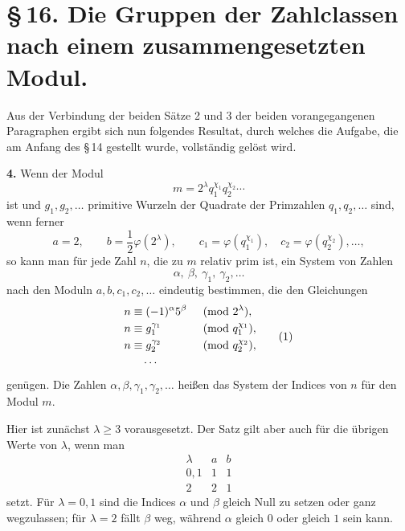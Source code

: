 \documentclass[11pt]{article}
\begin{document}

\section*{\S\,16. Die Gruppen der Zahlclassen nach einem zusammengesetzten Modul.}

Aus der Verbindung der beiden Sätze 2 und 3 der beiden vorangegangenen Paragraphen ergibt sich nun folgendes Resultat, durch welches die Aufgabe, die am Anfang des \S\,14 gestellt wurde, vollständig gelöst wird.

\medskip
\noindent\textbf{4.} Wenn der Modul
\begin{equation}
 m=2^\lambda q_1^{\chi_1}q_2^{\chi_2}\cdots
\end{equation}
ist und $g_1,g_2,\ldots$ primitive Wurzeln der Quadrate der Primzahlen $q_1,q_2,\ldots$ sind, wenn ferner
\[
 a=2,
 \qquad b=\frac12\varphi(2^\lambda),
 \qquad c_1=\varphi(q_1^{\chi_1}),\quad c_2=\varphi(q_2^{\chi_2}),\ldots,
\]
so kann man für jede Zahl $n$, die zu $m$ relativ prim ist, ein System von Zahlen
\[
 \alpha,\ \beta,\ \gamma_1,\ \gamma_2,\ldots
\]
nach den Moduln $a,b,c_1,c_2,\ldots$ eindeutig bestimmen, die den Gleichungen
\begin{equation}
\begin{aligned}
 n&\equiv (-1)^\alpha 5^\beta &&\pmod {2^\lambda},\\
 n&\equiv g_1^{\gamma_1} &&\pmod {q_1^{\chi_1}},\\
 n&\equiv g_2^{\gamma_2} &&\pmod {q_2^{\chi_2}},\\
 &\hspace{1.0em}\cdots
\end{aligned}
\tag{1}
\end{equation}
genügen. Die Zahlen $\alpha,\beta,\gamma_1,\gamma_2,\ldots$ heißen das System der Indices von $n$ für den Modul $m$.

Hier ist zunächst $\lambda\geq 3$ vorausgesetzt. Der Satz gilt aber auch für die übrigen Werte von $\lambda$, wenn man
\[
\begin{array}{c|cc}
\lambda& a&b\\ \hline
0,1&1&1\\
2&2&1
\end{array}
\]
setzt. Für $\lambda=0,1$ sind die Indices $\alpha$ und $\beta$ gleich Null zu setzen oder ganz wegzulassen; für $\lambda=2$ fällt $\beta$ weg, während $\alpha$ gleich $0$ oder gleich $1$ sein kann.
\end{document}
